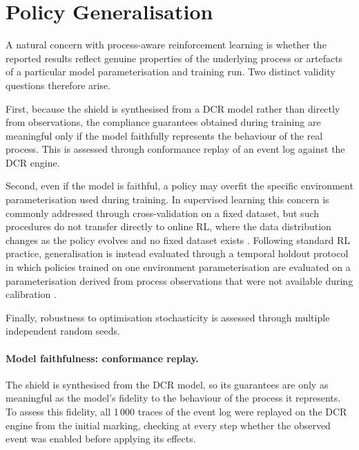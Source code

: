 
\section{Policy Generalisation}
\label{sec:policy_generalisation}

A natural concern with process-aware reinforcement learning is whether
the reported results reflect genuine properties of the underlying
process or artefacts of a particular model parameterisation and
training run. Two distinct validity questions therefore arise.

First, because the shield is synthesised from a \ac{DCR} model rather
than directly from observations, the compliance guarantees obtained
during training are meaningful only if the model faithfully represents
the behaviour of the real process. This is assessed through
conformance replay of an event log against the \ac{DCR} engine.

Second, even if the model is faithful, a policy may overfit the
specific environment parameterisation used during training. In
supervised learning this concern is commonly addressed through
cross-validation on a fixed dataset, but such procedures do not
transfer directly to online \ac{RL}, where the data distribution
changes as the policy evolves and no fixed dataset exists
\cite{Henderson2019DeepMatters}. Following standard \ac{RL} practice,
generalisation is instead evaluated through a temporal holdout
protocol in which policies trained on one environment
parameterisation are evaluated on a parameterisation derived from
process observations that were not available during calibration
\cite{CobbeQuantifyingLearning}.

Finally, robustness to optimisation stochasticity is assessed through
multiple independent random seeds.

\paragraph{Model faithfulness: conformance replay.}

The shield is synthesised from the \ac{DCR} model, so its guarantees
are only as meaningful as the model's fidelity to the behaviour of the
process it represents. To assess this fidelity, all 1\,000 traces of
the event log were replayed on the \ac{DCR} engine from the initial
marking, checking at every step whether the observed event was enabled
before applying its effects.

